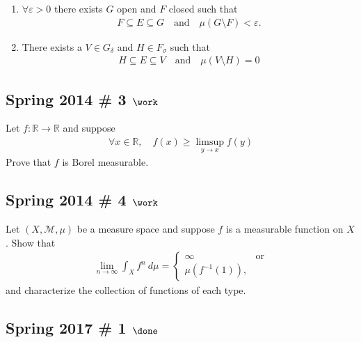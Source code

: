 \begin{enumerate}
\def\labelenumi{\arabic{enumi}.}
\tightlist
\item
  \(\forall \varepsilon > 0\) there exists \(G\) open and \(F\) closed
  such that
  \begin{align*}
  F \subseteq E \subseteq G \quad \text{and} \quad \mu(G\setminus F) < \varepsilon.
  \end{align*}
\item
  There exists a \(V \in G_\delta\) and \(H \in F_\sigma\) such that
  \begin{align*}
  H \subseteq E \subseteq V \quad \text{and}\quad \mu(V\setminus H) = 0
  \end{align*}
\end{enumerate}

\hypertarget{spring-2014-3-work}{%
\subsection{\texorpdfstring{Spring 2014 \# 3
\(\work\)}{Spring 2014 \# 3 \textbackslash work}}\label{spring-2014-3-work}}

Let \(f: {\mathbb{R}}\to {\mathbb{R}}\) and suppose
\begin{align*}
\forall x\in {\mathbb{R}},\quad f(x) \geq \limsup _{y \rightarrow x} f(y)
\end{align*}
Prove that \(f\) is Borel measurable.

\hypertarget{spring-2014-4-work}{%
\subsection{\texorpdfstring{Spring 2014 \# 4
\(\work\)}{Spring 2014 \# 4 \textbackslash work}}\label{spring-2014-4-work}}

Let \((X, \mathcal M, \mu)\) be a measure space and suppose \(f\) is a
measurable function on \(X\). Show that
\begin{align*}
\lim _{n \rightarrow \infty} \int_{X} f^{n} ~d \mu =
\begin{cases}
\infty & \text{or} \\
\mu(f^{-1}(1)),
\end{cases}
\end{align*}
and characterize the collection of functions of each type.

\hypertarget{spring-2017-1-done}{%
\subsection{\texorpdfstring{Spring 2017 \# 1
\(\done\)}{Spring 2017 \# 1 \textbackslash done}}\label{spring-2017-1-done}}

